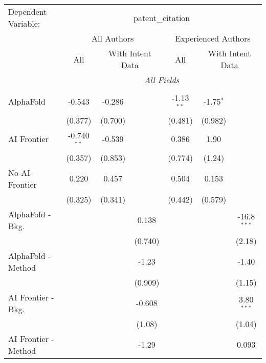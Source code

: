 \begingroup
\centering
\begin{tabular}{lcccccc}
   \tabularnewline \midrule \midrule
   Dependent Variable: & \multicolumn{6}{c}{patent\_citation}\\
 & \multicolumn{3}{c}{All Authors} & \multicolumn{3}{c}{Experienced Authors} \\
\cmidrule(lr){2-4} \cmidrule(lr){5-7}
 & \multicolumn{1}{c}{All} & \multicolumn{2}{c}{With Intent Data} & \multicolumn{1}{c}{All} & \multicolumn{2}{c}{With Intent Data} \\
\cmidrule(lr){2-2} \cmidrule(lr){3-4} \cmidrule(lr){5-5} \cmidrule(lr){6-7}
 & \multicolumn{6}{c}{\textit{All Fields}} \\ \\
   AlphaFold               & -0.543        & -0.286  &             & -1.13$^{**}$ & -1.75$^{*}$ &   \\   
                           & (0.377)       & (0.700) &             & (0.481)      & (0.982)     &   \\   
   AI Frontier             & -0.740$^{**}$ & -0.539  &             & 0.386        & 1.90        &   \\   
                           & (0.357)       & (0.853) &             & (0.774)      & (1.24)      &   \\   
   No AI Frontier          & 0.220         & 0.457   &             & 0.504        & 0.153       &   \\   
                           & (0.325)       & (0.341) &             & (0.442)      & (0.579)     &   \\   
   AlphaFold - Bkg.        &               &         & 0.138       &              &             & -16.8$^{***}$\\   
                           &               &         & (0.740)     &              &             & (2.18)\\   
   AlphaFold - Method      &               &         & -1.23       &              &             & -1.40\\   
                           &               &         & (0.909)     &              &             & (1.15)\\   
   AI Frontier - Bkg.      &               &         & -0.608      &              &             & 3.80$^{***}$\\   
                           &               &         & (1.08)      &              &             & (1.04)\\   
   AI Frontier - Method    &               &         & -1.29       &              &             & 0.093\\   

\end{tabular}
